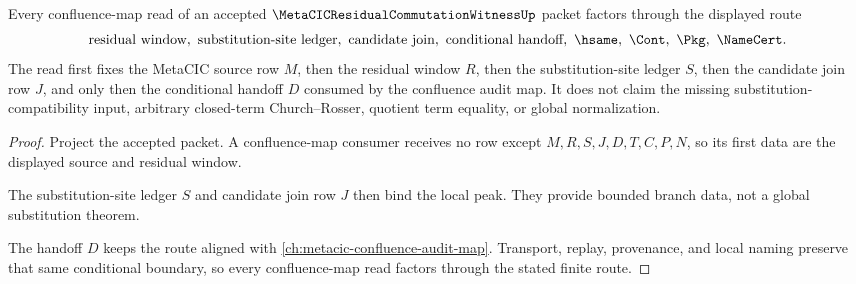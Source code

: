 \begin{theorem}
\label{thm:metacic-residual-commutation-witness-confluence-map-route}
Every confluence-map read of an accepted $\MetaCICResidualCommutationWitnessUp$ packet factors through the displayed route
$$
\text{residual window},\ \text{substitution-site ledger},\ \text{candidate join},\ \text{conditional handoff},\ \hsame,\ \Cont,\ \Pkg,\ \NameCert .
$$
The read first fixes the MetaCIC source row $M$, then the residual window $R$, then the substitution-site ledger $S$, then the candidate join row $J$, and only then the conditional handoff $D$ consumed by the confluence audit map. It does not claim the missing substitution-compatibility input, arbitrary closed-term Church--Rosser, quotient term equality, or global normalization.
\end{theorem}
\begin{proof}
Project the accepted packet. A confluence-map consumer receives no row except $M,R,S,J,D,T,C,P,N$, so its first data are the displayed source and residual window.

The substitution-site ledger $S$ and candidate join row $J$ then bind the local peak. They provide bounded branch data, not a global substitution theorem.

The handoff $D$ keeps the route aligned with \autoref{ch:metacic-confluence-audit-map}. Transport, replay, provenance, and local naming preserve that same conditional boundary, so every confluence-map read factors through the stated finite route.
\end{proof}



